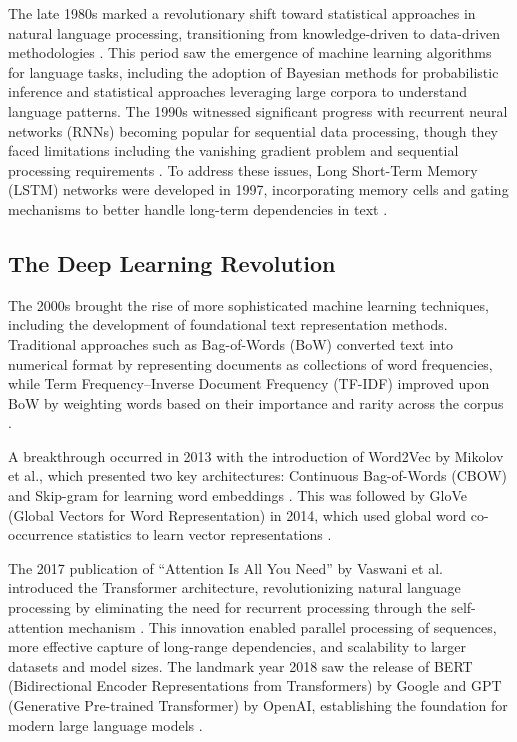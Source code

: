 \documentclass[11pt, titlepage, bibliography=totoc]{scrreprt}
\begin{document}
The late 1980s marked a revolutionary shift toward statistical approaches in natural language processing, transitioning from knowledge-driven to data-driven methodologies \cite{church1988}. This period saw the emergence of machine learning algorithms for language tasks, including the adoption of Bayesian methods for probabilistic inference and statistical approaches leveraging large corpora to understand language patterns. The 1990s witnessed significant progress with recurrent neural networks (RNNs) becoming popular for sequential data processing, though they faced limitations including the vanishing gradient problem and sequential processing requirements \cite{bengio1994}. To address these issues, Long Short-Term Memory (LSTM) networks were developed in 1997, incorporating memory cells and gating mechanisms to better handle long-term dependencies in text \cite{hochreiter1997}.

\subsection{The Deep Learning Revolution}
The 2000s brought the rise of more sophisticated machine learning techniques, including the development of foundational text representation methods. Traditional approaches such as Bag-of-Words (BoW) converted text into numerical format by representing documents as collections of word frequencies, while Term Frequency–Inverse Document Frequency (TF-IDF) improved upon BoW by weighting words based on their importance and rarity across the corpus \cite{salton1988}.

A breakthrough occurred in 2013 with the introduction of Word2Vec by Mikolov et al., which presented two key architectures: Continuous Bag-of-Words (CBOW) and Skip-gram for learning word embeddings \cite{mikolov2013a}. This was followed by GloVe (Global Vectors for Word Representation) in 2014, which used global word co-occurrence statistics to learn vector representations \cite{pennington2014}.

The 2017 publication of ``Attention Is All You Need'' by Vaswani et al. introduced the Transformer architecture, revolutionizing natural language processing by eliminating the need for recurrent processing through the self-attention mechanism \cite{vaswani2017}. This innovation enabled parallel processing of sequences, more effective capture of long-range dependencies, and scalability to larger datasets and model sizes. The landmark year 2018 saw the release of BERT (Bidirectional Encoder Representations from Transformers) by Google and GPT (Generative Pre-trained Transformer) by OpenAI, establishing the foundation for modern large language models \cite{radford2018}.
\end{document}
